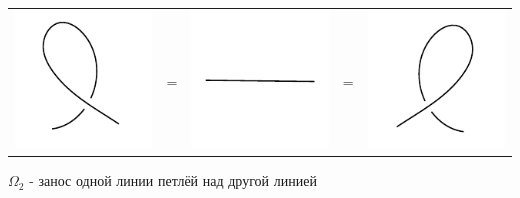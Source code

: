 \begin{tabular}{
>{\centering\arraybackslash}m{3cm}>{\centering\arraybackslash}m{0.4cm}
>{\centering\arraybackslash}m{3cm}>{\centering\arraybackslash}m{0.4cm}
>{\centering\arraybackslash}m{3cm}
}
\includegraphics{images/close-loop-l.pdf}
&
=
&
\includegraphics{images/line.pdf}
&
=
&
\includegraphics{images/close-loop-r.pdf}
\end{tabular}

$\Omega_2$ - занос одной линии петлёй над другой линией


